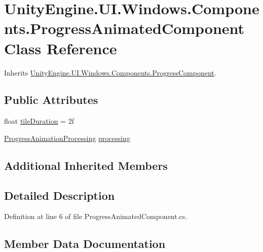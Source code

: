 \hypertarget{class_unity_engine_1_1_u_i_1_1_windows_1_1_components_1_1_progress_animated_component}{}\section{Unity\+Engine.\+U\+I.\+Windows.\+Components.\+Progress\+Animated\+Component Class Reference}
\label{class_unity_engine_1_1_u_i_1_1_windows_1_1_components_1_1_progress_animated_component}


Inherits \hyperlink{class_unity_engine_1_1_u_i_1_1_windows_1_1_components_1_1_progress_component}{Unity\+Engine.\+U\+I.\+Windows.\+Components.\+Progress\+Component}.

\subsection*{Public Attributes}
\begin{DoxyCompactItemize}
\item 
float \hyperlink{class_unity_engine_1_1_u_i_1_1_windows_1_1_components_1_1_progress_animated_component_a22d2a1aaa168bf789988ae63ecf64bf3}{tile\+Duration} = 2f
\item 
\hyperlink{class_unity_engine_1_1_u_i_1_1_windows_1_1_components_1_1_progress_animation_processing}{Progress\+Animation\+Processing} \hyperlink{class_unity_engine_1_1_u_i_1_1_windows_1_1_components_1_1_progress_animated_component_a5bf587a3db926534846d98abfa30ccc6}{processing}
\end{DoxyCompactItemize}
\subsection*{Additional Inherited Members}


\subsection{Detailed Description}


Definition at line 6 of file Progress\+Animated\+Component.\+cs.



\subsection{Member Data Documentation}
\hypertarget{class_unity_engine_1_1_u_i_1_1_windows_1_1_components_1_1_progress_animated_component_a5bf587a3db926534846d98abfa30ccc6}{}
